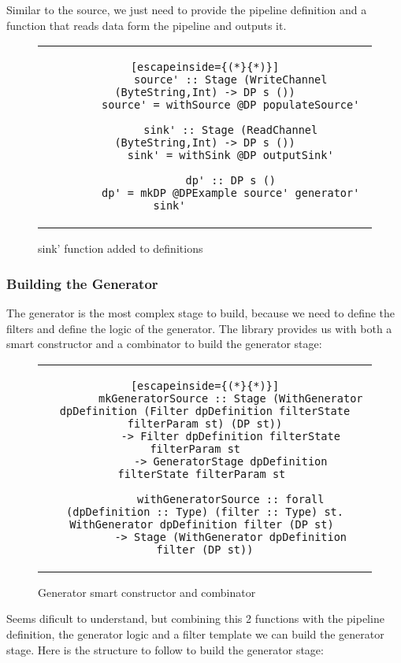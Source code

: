 Similar to the source, we just need to provide the pipeline definition and a function that reads data form the pipeline and outputs it. 

\begin{figure}[H]
    \centering
    \begin{tabular}{c}
        \begin{lstlisting}[escapeinside={(*}{*)}]
        source' :: Stage (WriteChannel (ByteString,Int) -> DP s ())
        source' = withSource @DP populateSource'

        sink' :: Stage (ReadChannel (ByteString,Int) -> DP s ())
        sink' = withSink @DP outputSink'

        dp' :: DP s ()
        dp' = mkDP @DPExample source' generator' sink'           
        \end{lstlisting}
    \end{tabular}
    \caption{sink' function added to definitions}
    \label{fig:DP17}
\end{figure}

\subsubsection{Building the Generator}
The generator is the most complex stage to build, because we need to define the filters and define the logic of the generator. 
The library provides us with both a smart constructor and a combinator to build the generator stage: 

\begin{figure}[H]
    \centering
    \begin{tabular}{c}
        \begin{lstlisting}[escapeinside={(*}{*)}]
        mkGeneratorSource :: Stage (WithGenerator dpDefinition (Filter dpDefinition filterState filterParam st) (DP st))
        -> Filter dpDefinition filterState filterParam st	
        -> GeneratorStage dpDefinition filterState filterParam st 
        
        withGeneratorSource :: forall (dpDefinition :: Type) (filter :: Type) st. WithGenerator dpDefinition filter (DP st)	
        -> Stage (WithGenerator dpDefinition filter (DP st))
        \end{lstlisting}
    \end{tabular}
    \caption{Generator smart constructor and combinator}
    \label{fig:DP18}
\end{figure}

Seems dificult to understand, but combining this 2 functions with the pipeline definition, the generator logic and a filter template we can build the generator stage. 
Here is the structure to follow to build the generator stage: 

